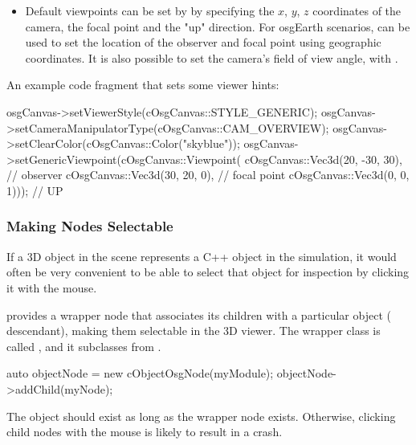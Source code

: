 \begin{itemize}
\item {}
    Default viewpoints can be set by 
    by specifying the $x$, $y$, $z$ coordinates of the camera, the focal
    point and the "up" direction. For osgEarth scenarios,
     can be used to set the
    location of the observer and focal point using geographic coordinates. It
    is also possible to set the camera's field of view angle, with
    .

\end{itemize}

An example code fragment that sets some viewer hints:

\begin{cpp}
osgCanvas->setViewerStyle(cOsgCanvas::STYLE_GENERIC);
osgCanvas->setCameraManipulatorType(cOsgCanvas::CAM_OVERVIEW);
osgCanvas->setClearColor(cOsgCanvas::Color("skyblue"));
osgCanvas->setGenericViewpoint(cOsgCanvas::Viewpoint(
        cOsgCanvas::Vec3d(20, -30, 30), // observer
        cOsgCanvas::Vec3d(30, 20, 0),   // focal point
        cOsgCanvas::Vec3d(0, 0, 1)));   // UP
\end{cpp}


\subsubsection{Making Nodes Selectable}
\label{sec:graphics:making-osg-nodes-selectable}

If a 3D object in the scene represents a C++ object in the simulation, it
would often be very convenient to be able to select that object for
inspection by clicking it with the mouse.

{\opp} provides a wrapper node that associates its children with a particular {\opp}
object ( descendant), making them selectable in the 3D viewer.
The wrapper class is called , and it subclasses
from .

\begin{cpp}
auto objectNode = new cObjectOsgNode(myModule);
objectNode->addChild(myNode);
\end{cpp}

\begin{note}
The {\opp} object should exist as long as the wrapper node exists. Otherwise,
clicking child nodes with the mouse is likely to result in a crash.
\end{note}

